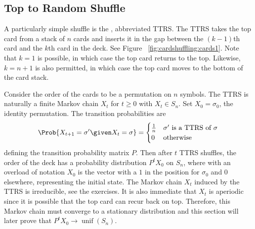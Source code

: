 \documentclass[12pt]{article}
\begin{document}
\subsection*{Top to Random Shuffle} A particularly simple shuffle is the
,%
abbreviated TTRS\@.  The TTRS takes the top card from a stack of \( n \)
cards and inserts it in the gap between the \( (k-1) \)th card and the \(
k \)th card in the deck.  See Figure~%
\ref{fig:cardshuffling:cards1}.  Note that \( k = 1 \) is possible, in
which case the top card returns to the top.  Likewise, \( k = n+1 \) is
also permitted, in which case the top card moves to the bottom of the
card stack.

Consider the order of the cards to be a permutation on \( n \) symbols.
The TTRS is naturally a finite Markov chain \( X_t \) for \( t \ge 0 \)
with \( X_t \in S_n \).  Set \( X_0 = \sigma_0 \), the identity
permutation.  The transition probabilities are
\[
    \Prob{X_{t+1} = \sigma' \given X_t = \sigma} =
    \begin{cases}
        \frac{1}{n} & \text{\( \sigma' \) is a TTRS of \( \sigma \)}\\
        0 & \text{otherwise}
    \end{cases}
\] defining the transition probability matrix \( P \). Then after \( t \)
TTRS shuffles, the order of the deck has a probability distribution \( 
P^t X_0 \) on \( S_n \), where with an overload of notation \( X_0
\) is the vector with a \( 1 \) in the position for \( \sigma_0 \) and
\( 0 \) elsewhere, representing the initial state.
The Markov chain \( X_t \) induced by the TTRS
is irreducible, see the exercises.  It is also immediate that \( X_t \)
is aperiodic since it is possible that the top card can recur back on
top.  Therefore, this Markov chain must converge to a stationary
distribution and this section will later prove that \( P^t X_0 \to
\operatorname{unif}
(S_n) \).
\end{document}
